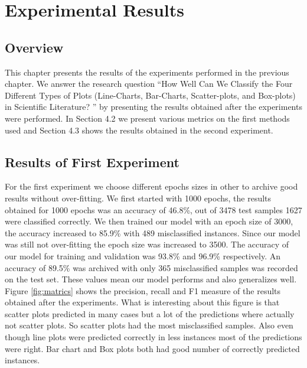 \documentclass[12pt, a4paper,oneside]{report}
\begin{document}
\chapter{Experimental Results}

 \section{Overview}
This chapter presents the results of the experiments performed in the previous chapter. We answer the research question
``How Well Can We Classify the Four Different Types of Plots (Line-Charts, Bar-Charts, Scatter-plots, and Box-plots) in Scientific Literature? '' by presenting the results obtained after the experiments were performed. In Section 4.2 we present various metrics on the first methods used and Section 4.3 shows the results obtained in the second experiment.

\section{Results of First Experiment}
For the first experiment we choose different epochs sizes in other to archive good results without over-fitting. We first started with 1000 epochs, the results obtained for 1000 epochs was an accuracy of 46.8\%, out of 3478 test samples 1627 were classified correctly. We then trained our model with an epoch size of 3000, the accuracy increased to 85.9\% with 489 misclassified instances. Since our model was still not over-fitting the epoch size was increased to 3500. The accuracy of our model for training and validation was 93.8\% and 96.9\% respectively. An accuracy of 89.5\% was archived with only 365 misclassified samples was recorded on the test set. These values mean our model performs and also generalizes well.
Figure \ref{fig:matrics} shows the precision, recall and F1 measure of the results obtained after the experiments. What is interesting about this figure is that scatter plots predicted in many cases but a lot of the predictions where actually not scatter plots. So scatter plots had the most misclassified samples. Also even though line plots were predicted correctly in less instances most of the predictions were right. Bar chart and Box plots both had good number of correctly predicted instances.
\end{document}
